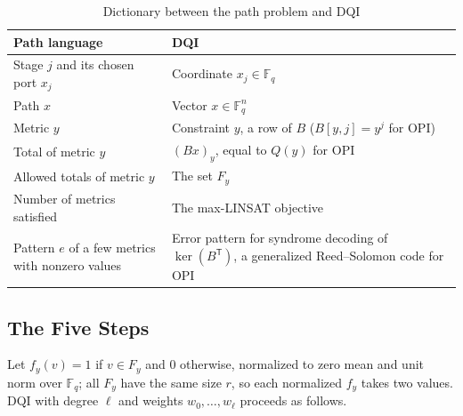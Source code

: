 \documentclass[journal]{IEEEtran}
\begin{document}
\begin{table}[t]
\caption{Dictionary between the path problem and DQI}
\label{tab:dictionary}
\centering
\footnotesize
\begin{tabular}{p{}p{}}
\hline \hline
\textbf{Path language} & \textbf{DQI} \\
\hline
Stage $j$ and its chosen port $x_{j}$ & Coordinate $x_{j}\in\mathbb{F}_{q}$ \\
Path $x$ & Vector $x\in\mathbb{F}_{q}^{n}$ \\
Metric $y$ & Constraint $y$, a row of $B$ ($B[y,j]=y^{j}$ for OPI) \\
Total of metric $y$ & $(Bx)_{y}$, equal to $Q(y)$ for OPI \\
Allowed totals of metric $y$ & The set $F_{y}$ \\
Number of metrics satisfied & The max-LINSAT objective \\
Pattern $e$ of a few metrics with nonzero values & Error pattern for syndrome decoding of $\ker(B^{\mathsf T})$, a generalized Reed--Solomon code for OPI \\
\hline \hline
\end{tabular}
\end{table}

\subsection{The Five Steps}

Let $f_{y}(v)=1$ if $v\in F_{y}$ and $0$ otherwise, normalized to zero mean and unit norm over $\mathbb{F}_{q}$; all $F_{y}$ have the same size $r$, so each normalized $f_{y}$ takes two values. DQI with degree $\ell$ and weights $w_{0},\dots,w_{\ell}$ proceeds as follows.
\end{document}
